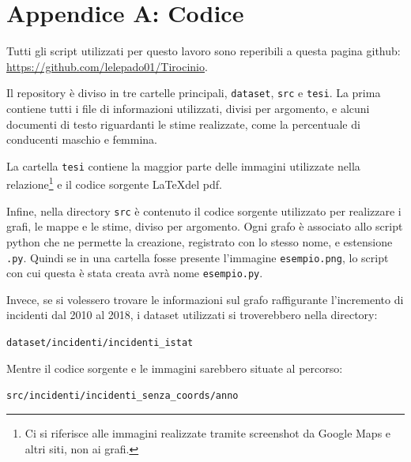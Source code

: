 \documentclass[a4paper,12pt]{report}
\newcommand{\columnstyle}[1]{\texttt{#1}}
\newcommand{\filenamestyle}[1]{\texttt{#1}}
\newcommand{\skipline}{\vspace{0.2in}}
\begin{document}

\appendix
\chapter{Appendice A: Codice}

Tutti gli script utilizzati per questo lavoro sono reperibili a questa pagina 
github: \url{https://github.com/lelepado01/Tirocinio}.

Il repository è diviso in tre cartelle principali, \filenamestyle{dataset}, \filenamestyle{src} 
e \filenamestyle{tesi}. La prima contiene tutti i file di informazioni utilizzati, divisi per 
argomento, e alcuni documenti di testo riguardanti le stime realizzate, come la percentuale di 
conducenti maschio e femmina.

La cartella \columnstyle{tesi} contiene la maggior parte delle immagini utilizzate 
nella relazione\footnote{Ci si riferisce alle immagini realizzate tramite screenshot 
da Google Maps e altri siti, non ai grafi.} 
e il codice sorgente \LaTeX del pdf.

Infine, nella directory \filenamestyle{src} è contenuto il codice sorgente utilizzato per realizzare 
i grafi, le mappe e le stime, diviso per argomento. 
Ogni grafo è associato allo script python che ne permette la creazione, registrato con 
lo stesso nome, e estensione \filenamestyle{.py}. 
Quindi se in una cartella fosse presente l'immagine \filenamestyle{esempio.png}, lo script con 
cui questa è stata creata avrà nome \filenamestyle{esempio.py}.

Invece, se si volessero trovare le informazioni sul grafo raffigurante 
l'incremento di incidenti 
dal 2010 al 2018, i dataset utilizzati si troverebbero nella directory:

\skipline
\indent\filenamestyle{dataset/incidenti/incidenti\_istat}

\skipline
\noindent Mentre il codice sorgente e le immagini sarebbero situate al percorso:

\skipline
\indent\filenamestyle{src/incidenti/incidenti\_senza\_coords/anno}

\printbibliography
\end{document}
